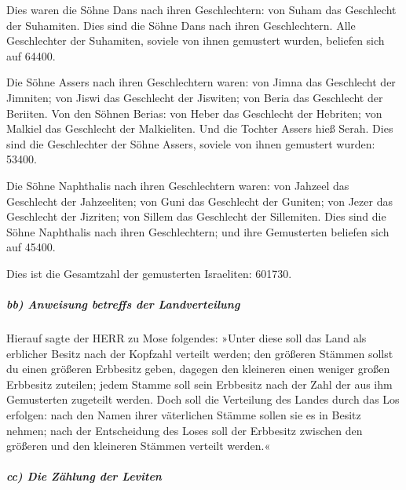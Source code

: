 Dies waren die Söhne Dans nach ihren Geschlechtern: von
Suham das Geschlecht der Suhamiten. Dies sind die Söhne
Dans nach ihren Geschlechtern. Alle Geschlechter der Suhamiten, soviele
von ihnen gemustert wurden, beliefen sich auf 64400.

Die Söhne Assers nach ihren Geschlechtern waren: von
Jimna das Geschlecht der Jimniten; von Jiswi das Geschlecht der
Jiswiten; von Beria das Geschlecht der Beriiten. Von den
Söhnen Berias: von Heber das Geschlecht der Hebriten; von Malkiel das
Geschlecht der Malkieliten. Und die Tochter Assers hieß
Serah. Dies sind die Geschlechter der Söhne Assers,
soviele von ihnen gemustert wurden: 53400.

Die Söhne Naphthalis nach ihren Geschlechtern waren: von
Jahzeel das Geschlecht der Jahzeeliten; von Guni das Geschlecht der
Guniten; von Jezer das Geschlecht der Jizriten; von
Sillem das Geschlecht der Sillemiten. Dies sind die Söhne
Naphthalis nach ihren Geschlechtern; und ihre Gemusterten beliefen sich
auf 45400.

Dies ist die Gesamtzahl der gemusterten Israeliten:
601730.

\hypertarget{bb-anweisung-betreffs-der-landverteilung}{%
\subparagraph{bb) Anweisung betreffs der
Landverteilung}\label{bb-anweisung-betreffs-der-landverteilung}}

Hierauf sagte der HERR zu Mose folgendes:
»Unter diese soll das Land als erblicher Besitz nach der
Kopfzahl verteilt werden; den größeren Stämmen sollst du
einen größeren Erbbesitz geben, dagegen den kleineren einen weniger
großen Erbbesitz zuteilen; jedem Stamme soll sein Erbbesitz nach der
Zahl der aus ihm Gemusterten zugeteilt werden. Doch soll
die Verteilung des Landes durch das Los erfolgen: nach den Namen ihrer
väterlichen Stämme sollen sie es in Besitz nehmen; nach
der Entscheidung des Loses soll der Erbbesitz zwischen den größeren und
den kleineren Stämmen verteilt werden.«

\hypertarget{cc-die-zuxe4hlung-der-leviten}{%
\subparagraph{cc) Die Zählung der
Leviten}\label{cc-die-zuxe4hlung-der-leviten}}

